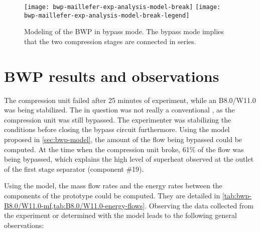 \begin{figure}
  \centering
  \texttt{[image: bwp-maillefer-exp-analysis-model-break]}
  \texttt{[image: bwp-maillefer-exp-analysis-model-break-legend]}
  \caption[Modeling of the BWP in bypass mode]
  {Modeling of the BWP in bypass mode. The bypass mode implies that
    the two compression stages are connected in series.}
  \label{fig:bwp-maillefer-break-model}
\end{figure}

\section{BWP results and observations}
\label{sec:bwp-perfs}

The compression unit failed after 25 minutes of experiment, while an
\OP{} B8.0/W11.0 was being stabilized. The \OP{} in question was not
really a conventional \OP{}, as the compression unit was still
bypassed. The experimenter was stabilizing the conditions before
closing the bypass circuit furthermore. Using the model proposed in
\cref{sec:bwp-model}, the amount of the flow being bypassed could be
computed. At the time when the compression unit broke, 61\% of the
flow was being bypassed, which explains the high level of
superheat observed at the outlet of the first stage separator
(component \#19).

Using the model, the mass flow rates and the energy rates between the
components of the prototype could be computed. They are detailed in
\cref{tab:bwp-B8.0/W11.0-mf,tab:B8.0/W11.0-energy-flows}. Observing the data
collected from the experiment or determined with the model leads to
the following general observations:

